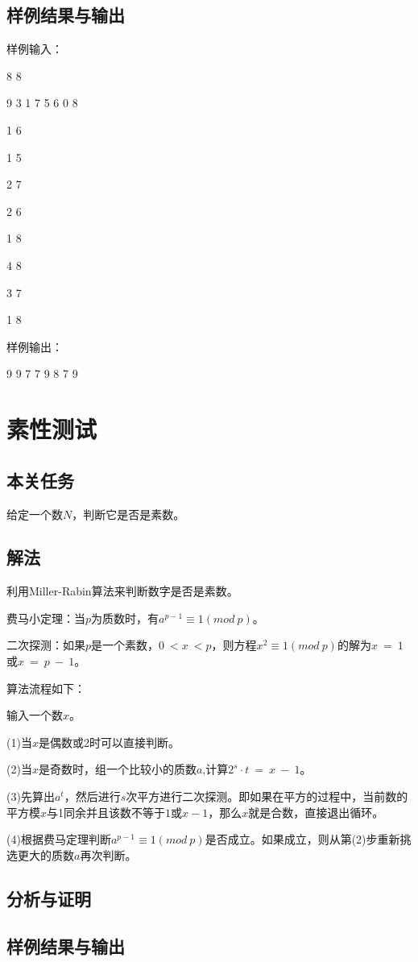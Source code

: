 \documentclass[UTF8,a4paperdui, %
]{ctexart}
\begin{document}
\subsection{样例结果与输出}
样例输入：

8 8

9 3 1 7 5 6 0 8

1 6

1 5

2 7

2 6

1 8

4 8

3 7

1 8

样例输出：

9 9 7 7 9 8 7 9
\section{素性测试}
\subsection{本关任务}
给定一个数$N$，判断它是否是素数。
\subsection{解法}
利用Miller-Rabin算法来判断数字是否是素数。

费马小定理：当$p$为质数时，有$a^{p-1}\equiv 1(mod\ p)$。

二次探测：如果$p$是一个素数，$0\ < x\ < p$，则方程$x^2\equiv 1(mod\ p)$的解为$x\ =\ 1$或$x\ =\ p\ -\ 1$。

算法流程如下：

输入一个数$x$。

(1)当$x$是偶数或2时可以直接判断。

(2)当$x$是奇数时，组一个比较小的质数$a$,计算$2^s\cdot t\ =\ x\ -\ 1$。

(3)先算出$a^t$，然后进行$s$次平方进行二次探测。即如果在平方的过程中，当前数的平方模$x$与1同余并且该数不等于$1$或$x-1$，那么$x$就是合数，直接退出循环。

(4)根据费马定理判断$a^{p-1}\equiv 1(mod\ p)$是否成立。如果成立，则从第(2)步重新挑选更大的质数$a$再次判断。


\subsection{分析与证明}

\subsection{样例结果与输出}
\end{document}
